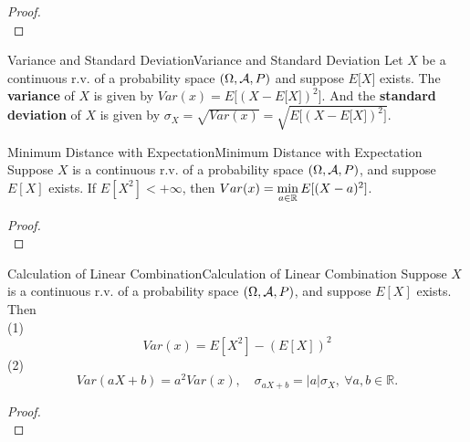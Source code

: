 \documentclass{elegantbook}
\begin{document}
\begin{proof}
\\[4cm]\vspace{0.01cm}
\end{proof}

\begin{definition}{Variance and Standard Deviation}{Variance and Standard Deviation}
Let $X$ be a continuous r.v. of a probability space $(\Omega,\mathcal{A}, P)$ and suppose $E\lbrack X\rbrack$ exists. The \textbf{variance} of $X$ is given by $Var(x) = E\lbrack(X - E\lbrack X\rbrack)^{2}\rbrack$. And the \textbf{standard deviation} of $X$ is given by
$\sigma_{X} = \sqrt{Var(x)} = \sqrt{E\lbrack(X - E\lbrack X\rbrack)^{2}\rbrack}$.
\end{definition}

\begin{theorem}{Minimum Distance with Expectation}{Minimum Distance with Expectation}
Suppose $X$ is a continuous r.v. of a probability space $(\Omega,\mathcal{A}, P)$, and suppose $E[X]$ exists. If $E\left[X^2\right]<+\infty$, then $Var(x)=\min\limits_{a\in\mathbb{R}}E[(X-a)^2]$.
\end{theorem}

\begin{proof}
\\[4cm]\vspace{0.01cm}
\end{proof}

\begin{theorem}{Calculation of Linear Combination}{Calculation of Linear Combination}
Suppose $X$ is a continuous r.v. of a probability space $(\Omega,\mathcal{A}, P)$, and suppose $E[X]$ exists. Then\\
(1)
$$
Var(x)=E\left[X^2\right]-(E[X])^2
$$
(2)
$$
Var(aX+b)=a^2Var(x),\quad
\sigma_{aX+b}=\left|a\right|\sigma_X,\ \forall a,b\in\mathbb{R}.
$$
\end{theorem}

\begin{proof}
\\[4cm]\vspace{0.01cm}
\end{proof}
\end{document}
